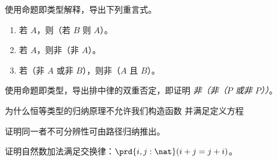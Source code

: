 \begin{ex}\label{ex:tautologies}
  使用命题即类型解释，导出下列重言式。
  \begin{enumerate}
  \item 若 $A$，则（若 $B$ 则 $A$）。
  \item 若 $A$，则非（非 $A$）。
  \item 若（非 $A$ 或非 $B$），则非（$A$ 且 $B$）。
  \end{enumerate}
\end{ex}

\begin{ex}\label{ex:not-not-lem}
  使用命题即类型，导出排中律的双重否定，即证明 \emph{非（非（$P$ 或非 $P$））}。
\end{ex}

\begin{ex}\label{ex:without-K}
  为什么恒等类型的归纳原理不允许我们构造函数
  并满足定义方程
\end{ex}

\begin{ex}\label{ex:subtFromPathInd}
  证明同一者不可分辨性可由路径归纳推出。  
\end{ex}

\begin{ex}\label{ex:add-nat-commutative}
  证明自然数加法满足交换律：$\prd{i,j:\nat} (i+j=j+i)$。
\end{ex}

